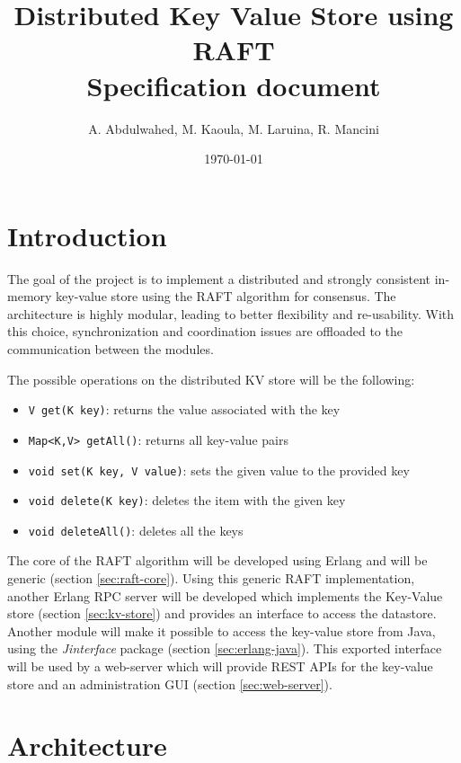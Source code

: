 \documentclass[a4paper]{article}
\author{A. Abdulwahed, M. Kaoula, M. Laruina, R. Mancini}
\title{Distributed Key Value Store using RAFT\\Specification document}
\date{\today}
\begin{document}
    \maketitle

    \section{Introduction}

    The goal of the project is to implement a distributed and strongly 
    consistent in-memory key-value store using the RAFT algorithm for consensus.
    The architecture is highly modular, leading to better flexibility and 
    re-usability. With this choice, synchronization and coordination issues are 
    offloaded to the communication between the modules.

    The possible operations on the distributed KV store will be the following:
    \begin{itemize}
        \item \texttt{V get(K key)}: returns the value associated with the key
        \item \texttt{Map<K,V> getAll()}: returns all key-value pairs
        \item \texttt{void set(K key, V value)}: sets the given value to the 
            provided key
        \item \texttt{void delete(K key)}: deletes the item with the given key
        \item \texttt{void deleteAll()}: deletes all the keys
    \end{itemize}

    The core of the RAFT algorithm will be developed using Erlang and will be 
    generic (section \ref{sec:raft-core}). Using this generic RAFT implementation, 
    another Erlang RPC server will be developed which implements the Key-Value 
    store (section \ref{sec:kv-store}) and provides an interface to access the 
    datastore. Another module will make it possible to access the key-value 
    store from Java, using the \emph{Jinterface} package 
    (section \ref{sec:erlang-java}). 
    This exported interface will be used by a web-server which will provide 
    REST APIs for the key-value store and an administration GUI
    (section \ref{sec:web-server}).

    \section{Architecture}
\end{document}
